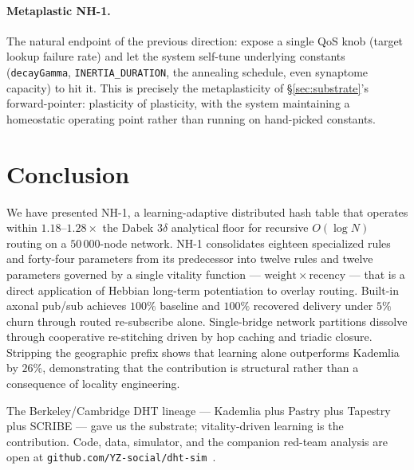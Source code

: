 \documentclass[conference]{IEEEtran}
\newcommand{\nhone}{NH-1\xspace}
\begin{document}
\paragraph{Metaplastic \nhone.} The natural endpoint of the previous
direction: expose a single QoS knob (target lookup failure rate) and
let the system self-tune underlying constants
(\texttt{decayGamma}, \texttt{INERTIA\_DURATION}, the annealing
schedule, even synaptome capacity) to hit it. This is precisely the
metaplasticity of \S\ref{sec:substrate}'s
forward-pointer: plasticity of plasticity, with the system maintaining
a homeostatic operating point rather than running on hand-picked
constants.

\section{Conclusion}
\label{sec:conclusion}

We have presented \nhone, a learning-adaptive distributed hash table
that operates within $1.18$--$1.28\times$ the Dabek $3\delta$
analytical floor for recursive $O(\log N)$ routing on a $50\,000$-node
network. \nhone consolidates eighteen specialized rules and
forty-four parameters from its predecessor into twelve rules and
twelve parameters governed by a single vitality function ---
$\mathrm{weight} \times \mathrm{recency}$ --- that is a direct
application of Hebbian long-term potentiation to overlay routing.
Built-in axonal pub/sub achieves $100\%$ baseline and $100\%$
recovered delivery under $5\%$ churn through routed re-subscribe alone.
Single-bridge network partitions dissolve through cooperative
re-stitching driven by hop caching and triadic closure. Stripping the
geographic prefix shows that learning alone outperforms Kademlia by
$26\%$, demonstrating that the contribution is structural rather than
a consequence of locality engineering.

The Berkeley/Cambridge DHT lineage --- Kademlia plus Pastry plus
Tapestry plus SCRIBE --- gave us the substrate; vitality-driven
learning is the contribution. Code, data, simulator, and the companion
red-team analysis are open at
\texttt{github.com/YZ-social/dht-sim}~\cite{dhtsim2026}.



\end{document}
